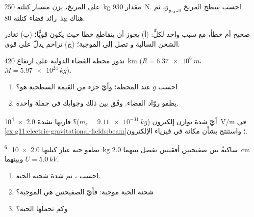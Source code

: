 \begin{exercise}[$\star$]\label{exo:g11:electric-gravitational-fields:4}
على المريخ، يزن مسبار كتلته \qty{250}{kg} مقدار \qty{930}{N}. احسب 
سطح المريخ $g_{\text{المريخ}}$، ثم  رائد فضاء كتلته \qty{80}{kg}
هناك.
\end{exercise}

\begin{exercise}[$\star$]\label{exo:g11:electric-gravitational-fields:5}
صحيح أم خطأ، مع سبب واحد لكلٍّ: (أ) يجوز أن يتقاطع خطا 
حيث يكون  قويًّا؛ (ب) تغادر  الشحن السالبة و
تصل إلى الموجبة؛ (ج) تزاحم  يدلّ على  قوي.
\end{exercise}

\begin{exercise}[$\star\star$]\label{exo:g11:electric-gravitational-fields:6}
تدور محطة الفضاء الدولية على ارتفاع \qty{420}{km}
($R = \qty{6.37e6}{m}$، $M = \qty{5.97e24}{kg}$).
\begin{enumerate}
  \item احسب $g$ عند المحطة؛ وأيّ جزء من القيمة السطحية هو؟
  \item يطفو روّاد الفضاء. وفّق بين ذلك وجوابك في جملة
        واحدة.
\end{enumerate}
\end{exercise}

\begin{exercise}[$\star\star$]\label{exo:g11:electric-gravitational-fields:7}
أيّ شدة  توازن  إلكترون
($m_e = \qty{9.11e-31}{kg}$)؟ قارنها بشدة \qty{2.0e4}{V/m}
في \cref{ex:g11:electric-gravitational-fields:beam}؛ واستنتج بشأن
مكانة  في فيزياء الإلكترون.
\end{exercise}

\begin{exercise}[$\star\star$]\label{exo:g11:electric-gravitational-fields:8}
تطفو حبة غبار كتلتها \qty{2.0e-6}{kg} ساكنةً بين صفيحتين
أفقيتين تفصل بينهما \qty{2.0}{cm} وبينهما  $U = \qty{5.0}{kV}$.
\begin{enumerate}
  \item احسب ، ثم شدة شحنة الحبة.
  \item شحنة الحبة موجبة: فأيّ الصفيحتين هي الموجبة؟
  \item وكم  تحملها الحبة؟
\end{enumerate}
\end{exercise}

